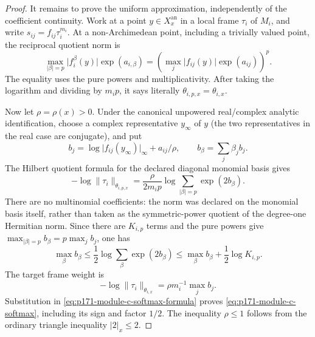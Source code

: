 \begin{proof}
It remains to prove the uniform approximation, independently of the
coefficient continuity.  Work at a point \(y\in X_x^{\mathrm{an}}\) in a
local frame \(\tau_i\) of \(M_i\), and write
\(s_{ij}=f_{ij}\tau_i^{m_i}\).  At a non-Archimedean point, including a
trivially valued point, the reciprocal quotient norm is
\[
 \max_{\lvert\beta\rvert=p}
 \lvert f_i^\beta(y)\rvert\exp(a_{i,\beta})
 =\left(\max_j\lvert f_{ij}(y)\rvert\exp(a_{ij})\right)^p.
\]
The equality uses the pure powers and multiplicativity.  After taking the
logarithm and dividing by \(m_ip\), it says literally
\(\theta_{i,p,x}=\theta_{i,x}\).

Now let \(\rho=\rho(x)>0\).  Under the canonical unpowered real/complex
analytic identification, choose a complex representative \(y_\infty\) of
\(y\) (the two representatives in the real case are conjugate), and put
\[
 b_j=\log\lvert f_{ij}(y_\infty)\rvert_\infty+a_{ij}/\rho,
 \qquad b_\beta=\sum_j\beta_jb_j.
\]
The Hilbert quotient formula for the declared diagonal monomial basis gives
\begin{equation}
 -\log\lVert\tau_i\rVert_{\theta_{i,p,x}}
 =\frac\rho{2m_ip}\log\sum_{\lvert\beta\rvert=p}\exp(2b_\beta).
 \label{eq:p171-module-c-softmax-formula}
\end{equation}
There are no multinomial coefficients: the norm was declared on the
monomial basis itself, rather than taken as the symmetric-power quotient of
the degree-one Hermitian norm.  Since there are \(K_{i,p}\) terms and the
pure powers give
\(\max_{\lvert\beta\rvert=p}b_\beta=p\max_jb_j\), one has
\[
 \max_\beta b_\beta
 \leq\frac12\log\sum_\beta\exp(2b_\beta)
 \leq\max_\beta b_\beta+\frac12\log K_{i,p}.
\]
The target frame weight is
\[
 -\log\lVert\tau_i\rVert_{\theta_{i,x}}
 =\rho m_i^{-1}\max_jb_j.
\]
Substitution in
\eqref{eq:p171-module-c-softmax-formula} proves
\eqref{eq:p171-module-c-softmax}, including its sign and factor \(1/2\).
The inequality \(\rho\leq1\) follows from the ordinary triangle inequality
\(\lvert2\rvert_x\leq2\).


\end{proof}
